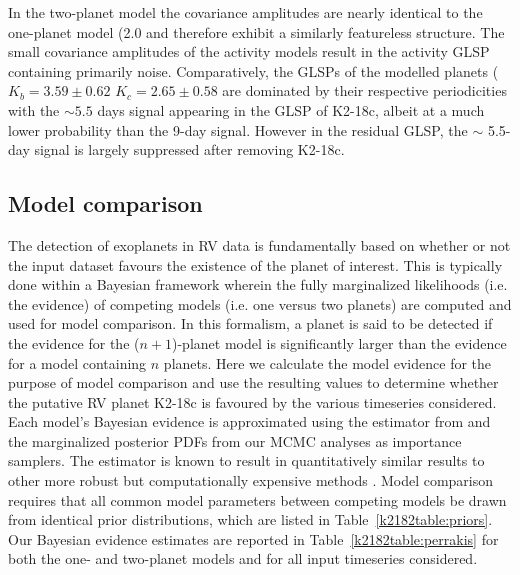 In the two-planet model the covariance amplitudes are nearly identical to the one-planet model (2.0 \mps{)}
and therefore exhibit a similarly featureless structure. The small covariance amplitudes of the activity
models result in the activity GLSP containing primarily noise. Comparatively, the GLSPs of the modelled planets
($K_b=3.59\pm 0.62$ \mps{,} $K_c=2.65\pm 0.58$ \mps{)} are dominated
by their respective periodicities with the $\sim 5.5$ days signal appearing in the GLSP
of K2-18c, albeit at a much lower probability than the 9-day signal. However in the residual GLSP, the
$\sim$ 5.5-day signal is largely suppressed after removing K2-18c. 

\subsection{Model comparison} \label{k2182sect:evidence}
The detection of exoplanets in RV data is fundamentally based on whether or not the input dataset favours the
existence of the planet of interest. This is typically done within a Bayesian framework wherein the fully marginalized
likelihoods (i.e. the evidence) of competing models (i.e. one versus two planets) are computed and used for model comparison.
In this formalism, a planet is said to be detected if the evidence for the ($n+1$)-planet model is significantly larger
than the evidence for a model containing $n$ planets. Here we calculate the model evidence for the purpose of model
comparison and use the resulting values to determine whether  the putative RV planet K2-18c is favoured by
the various timeseries considered. \\

Each model's Bayesian evidence is approximated using the estimator from \cite{perrakis13} and the marginalized
posterior PDFs from our MCMC analyses as importance samplers. The \cite{perrakis13} estimator is known to result in
quantitatively similar results to other more robust but computationally expensive methods
\citep[e.g. nested samplers;][]{nelson18}. Model comparison requires that all common model parameters
between competing models be drawn from identical prior distributions, which are  listed in
Table~\ref{k2182table:priors}. Our Bayesian evidence estimates are reported in Table~\ref{k2182table:perrakis} for both the one-
and two-planet models and for all input timeseries considered. \\

